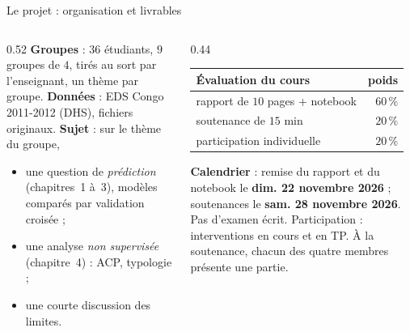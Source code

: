 \documentclass[aspectratio=169,11pt]{beamer}
\begin{document}
\begin{frame}{Le projet : organisation et livrables}
  \begin{columns}[T]
    \begin{column}{0.52\textwidth}
      \small
      \textbf{Groupes} : $36$ étudiants, $9$ groupes de $4$, tirés au sort par l'enseignant, un thème par groupe.
      \vskip1mm
      \textbf{Données} : EDS Congo 2011-2012 (DHS), fichiers originaux.
      \vskip1mm
      \textbf{Sujet} : sur le thème du groupe,
      \begin{itemize}\setlength\itemsep{1pt}
        \item une question de \emph{prédiction} (chapitres~1 à~3), modèles comparés par validation croisée ;
        \item une analyse \emph{non supervisée} (chapitre~4) : ACP, typologie ;
        \item une courte discussion des limites.
      \end{itemize}
    \end{column}
    \begin{column}{0.44\textwidth}
      \small
      \renewcommand{\arraystretch}{1.25}\setlength\tabcolsep{4pt}
      \begin{tabular}{lr}
        \toprule
        \textbf{Évaluation du cours} & \textbf{poids} \\
        \midrule
        rapport de $10$ pages + notebook & $60\,\%$ \\
        soutenance de $15$ min & $20\,\%$ \\
        participation individuelle & $20\,\%$ \\
        \bottomrule
      \end{tabular}
      \vskip2mm
      \textbf{Calendrier} : remise du rapport et du notebook le \textbf{dim. 22 novembre 2026} ; soutenances le \textbf{sam. 28 novembre 2026}.
      \vskip1mm
      {\footnotesize\color{cnfGris}Pas d'examen écrit. Participation : interventions en cours et en TP. À la soutenance, chacun des quatre membres présente une partie.}
    \end{column}
  \end{columns}
\end{frame}
\end{document}
